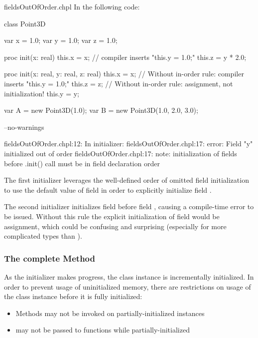 \begin{chapelexample}{fieldsOutOfOrder.chpl}
In the following code:
\begin{chapel}
class Point3D {
  var x = 1.0;
  var y = 1.0;
  var z = 1.0;

  proc init(x: real) {
    this.x = x;
    // compiler inserts "this.y = 1.0;"
    this.z = y * 2.0;
  }

  proc init(x: real, y: real, z: real) {
    this.x = x;
    // Without in-order rule: compiler inserts "this.y = 1.0;"
    this.z = z;
    // Without in-order rule: assignment, not initialization!
    this.y = y;
  }
}

var A = new Point3D(1.0);
var B = new Point3D(1.0, 2.0, 3.0);
\end{chapel}
\begin{chapelcompopts}
--no-warnings
\end{chapelcompopts}
\begin{chapeloutput}
fieldsOutOfOrder.chpl:12: In initializer:
fieldsOutOfOrder.chpl:17: error: Field "y" initialized out of order
fieldsOutOfOrder.chpl:17: note: initialization of fields before .init() call must be in field declaration order
\end{chapeloutput}

The first initializer leverages the well-defined order of omitted field
initialization to use the default value of field  in order to
explicitly initialize field .

The second initializer initializes field  before field ,
causing a compile-time error to be issued. Without this rule the explicit
initialization of field  would be assignment, which could be confusing
and surprising (especially for more complicated types than ).

\end{chapelexample}

\subsubsection{The complete Method}
\label{The_Complete_Method}

As the initializer makes progress, the class instance is incrementally
initialized. In order to prevent usage of uninitialized memory, there are
restrictions on usage of the class instance before it is fully initialized:

\begin{itemize}
\item Methods may not be invoked on partially-initialized instances
\item {} may not be passed to functions while partially-initialized
\end{itemize}

